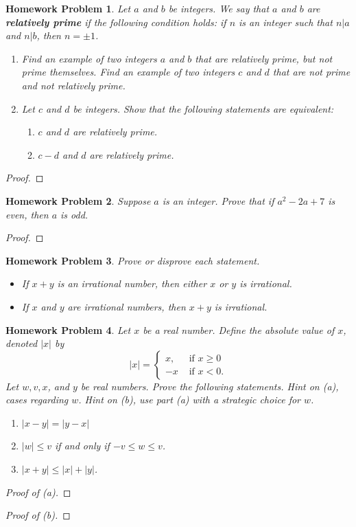 \documentclass{article}
\newtheorem{hw}{Homework Problem}
\newcommand{\bp}{\begin{proof}}
\newcommand{\ep}{\end{proof}}
\begin{document}
	\begin{hw}
		Let $a$ and $b$ be integers. We say that $a$ and $b$ are \textbf{relatively prime} if the following condition holds: if $n$ is an integer such that $n|a$ and $n|b$, then $n=\pm1$.
		\begin{enumerate}
			\item Find an example of two integers $a$ and $b$ that are relatively prime, but not prime themselves.
			Find an example of two integers $c$ and $d$ that are not prime and not relatively prime.
			\item Let  $c$ and $d$ be integers. Show that the following statements are equivalent:
			\begin{enumerate}
				\item[(i)] $c$ and $d$ are relatively prime.
				\item[(ii)] $c-d$ and $d$ are relatively prime.
			\end{enumerate}
		\end{enumerate}
	\end{hw}
	\bp
	\ep
	\begin{hw}
		Suppose $a$ is an integer. Prove that if $a^2-2a+7$ is even,  then $a$ is odd.
	\end{hw}
	\bp
	\ep
	\begin{hw}
		Prove or disprove each statement.
		\begin{itemize}
			\item[(i)] If $x+y$ is an irrational number, then either $x$ or $y$ is irrational.
			\item[(ii)] If $x$ and $y$ are irrational numbers, then $x+y$ is irrational.
		\end{itemize}
	\end{hw}
	\begin{hw}
		Let $x$ be a real number. \newline  Define the absolute value of $x$, denoted $|x|$ by
		$$|x| =
		\left\{
			\begin{array}{cl}
				x,  & \textrm{ if } x \geq 0    \\
				-x & \textrm{ if } x<0.
			\end{array}
		\right.
		$$
		Let $w, v, x$, and $y$ be real numbers. Prove the following statements. Hint on (a), cases regarding $w$. Hint on (b), use part (a) with a strategic choice for $w$.
		\begin{enumerate}
			\item[(a)] $|x-y| = |y-x|$
			\item[(b)]    $|w| \leq v$ if and only if $-v\leq  w \leq v$.
			\item[(c)]  $|x + y | \leq |x| + |y|$.
		\end{enumerate}
	\end{hw}
	\bp[ Proof of (a)]
	\ep
	\bp[ Proof of (b)] \ep
\end{document}

